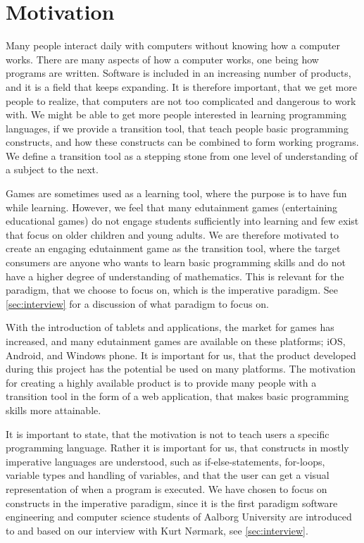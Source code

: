 \section{Motivation}
\label{sec:motivation}

Many people interact daily with computers without knowing how a computer works.
There are many aspects of how a computer works, one being how programs are written.
Software is included in an increasing number of products, and it is a field that keeps expanding.\cite{idaArtikelMangel}\cite{forbesMoreProgrammers}
It is therefore important, that we get more people to realize, that computers are not too complicated and dangerous to work with.
We might be able to get more people interested in learning programming languages, if we provide a transition tool, that teach people basic programming constructs, and how these constructs can be combined to form working programs.
We define a transition tool as a stepping stone from one level of understanding of a subject to the next.\newline

Games are sometimes used as a learning tool, where the purpose is to have fun while learning.
However, we feel that many edutainment games (entertaining educational games) do not engage students sufficiently into learning and few exist that focus on older children and young adults. 
We are therefore motivated to create an engaging edutainment game as the transition tool, where the target consumers are anyone who wants to learn basic programming skills and do not have a higher degree of understanding of mathematics. This is relevant for the paradigm, that we choose to focus on, which is the imperative paradigm. See \autoref{sec:interview} for a discussion of what paradigm to focus on.\newline

With the introduction of tablets and applications, the market for games has increased, and many edutainment games are available on these platforms; iOS, Android, and Windows phone.
It is important for us, that the product developed during this project has the potential be used on many platforms.
The motivation for creating a highly available product is to provide many people with a transition tool in the form of a web application, that makes basic programming skills more attainable.\newline

It is important to state, that the motivation is not to teach users a specific programming language.
Rather it is important for us, that constructs in mostly imperative languages are understood, such as if-else-statements, for-loops, variable types and handling of variables, and that the user can get a visual representation of when a program is executed. We have chosen to focus on constructs in the imperative paradigm, since it is the first paradigm software engineering and computer science students of Aalborg University are introduced to and based on our interview with Kurt N{\o}rmark, see \autoref{sec:interview}.\newline

